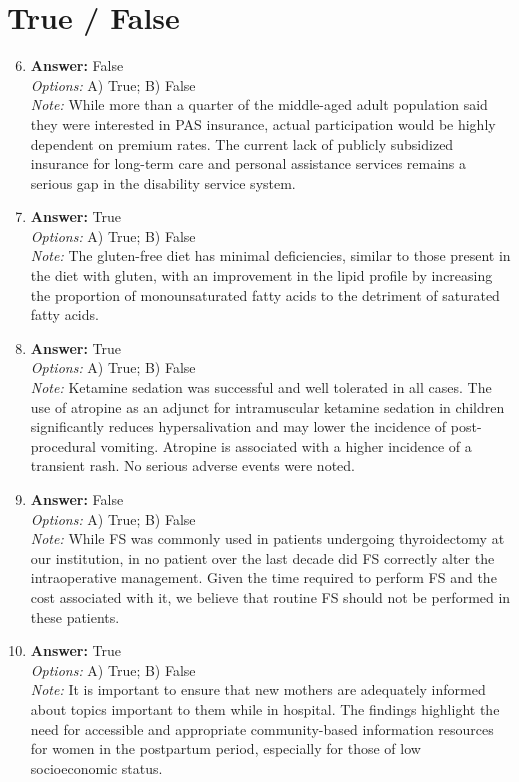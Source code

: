 \documentclass[12pt]{article}
\begin{document}
\section*{True / False}
\begin{enumerate}[label=\arabic*.]
\setcounter{enumi}{5}
\item \textbf{Answer:} False
\\ \textit{Options:} A) True; B) False
\\ \textit{Note:} While more than a quarter of the middle-aged adult population said they were interested in PAS insurance, actual participation would be highly dependent on premium rates. The current lack of publicly subsidized insurance for long-term care and personal assistance services remains a serious gap in the disability service system.
\item \textbf{Answer:} True
\\ \textit{Options:} A) True; B) False
\\ \textit{Note:} The gluten-free diet has minimal deficiencies, similar to those present in the diet with gluten, with an improvement in the lipid profile by increasing the proportion of monounsaturated fatty acids to the detriment of saturated fatty acids.
\item \textbf{Answer:} True
\\ \textit{Options:} A) True; B) False
\\ \textit{Note:} Ketamine sedation was successful and well tolerated in all cases. The use of atropine as an adjunct for intramuscular ketamine sedation in children significantly reduces hypersalivation and may lower the incidence of post-procedural vomiting. Atropine is associated with a higher incidence of a transient rash. No serious adverse events were noted.
\item \textbf{Answer:} False
\\ \textit{Options:} A) True; B) False
\\ \textit{Note:} While FS was commonly used in patients undergoing thyroidectomy at our institution, in no patient over the last decade did FS correctly alter the intraoperative management. Given the time required to perform FS and the cost associated with it, we believe that routine FS should not be performed in these patients.
\item \textbf{Answer:} True
\\ \textit{Options:} A) True; B) False
\\ \textit{Note:} It is important to ensure that new mothers are adequately informed about topics important to them while in hospital. The findings highlight the need for accessible and appropriate community-based information resources for women in the postpartum period, especially for those of low socioeconomic status.
\end{enumerate}
\end{document}
